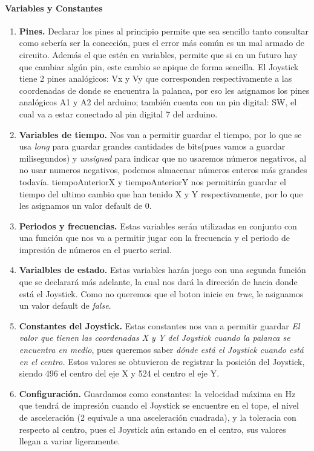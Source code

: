 \documentclass[conference]{IEEEtran}
\begin{document}
  \paragraph{Variables y Constantes}
  \begin{enumerate}
    \item \textbf{Pines.} Declarar los pines al principio permite que sea sencillo tanto consultar como sebería ser la conección, pues el error más común es un mal armado de circuito. Además el que estén en variables, permite que si en un futuro hay que cambiar algún pin, este cambio se apique de forma sencilla. El Joystick tiene 2 pines analógicos: Vx y Vy que corresponden respectivamente a las coordenadas de donde se encuentra la palanca, por eso les asignamos los pines analógicos A1 y A2 del arduino; también cuenta con un pin digital: SW, el cual va a estar conectado al pin digital 7 del arduino.
    \item \textbf{Variables de tiempo.} Nos van a permitir guardar el tiempo, por lo que se usa \textit{long} para guardar grandes cantidades de bits(pues vamos a guardar milisegundos) y \textit{unsigned} para indicar que no usaremos números negativos, al no usar numeros negativos, podemos almacenar números enteros más grandes todavía. tiempoAnteriorX y tiempoAnteriorY nos permitirán guardar el tiempo del ultimo cambio que han tenido X y Y respectivamente, por lo que les asignamos un valor default de 0.
    \item \textbf{Periodos y frecuencias. }Estas variables serán utilizadas en conjunto con una función que nos va a permitir jugar con la frecuencia y el periodo de impresión de números en el puerto serial.
    \item \textbf{Varialbles de estado. } Estas variables harán juego con una segunda función que se declarará más adelante, la cual nos dará la dirección de hacia donde está el Joystick. Como no queremos que el boton inicie en \textit{true}, le asignamos un valor default de \textit{false}.
    \item \textbf{Constantes del Joystick. } Estas constantes nos van a permitir guardar \textit{El valor que tienen las coordenadas X y Y del Joystick cuando la palanca se encuentra en medio}, pues queremos saber \textit{dónde está el Joystick cuando está en el centro.} Estos valores se obtuvieron de registrar la posición del Joystick, siendo 496 el centro del eje X y 524 el centro el eje Y.
    \item \textbf{Configuración.} Guardamos como constantes: la velocidad máxima en Hz que tendrá de impresión cuando el Joystick se encuentre en el tope,  el nivel de asceleración (2 equivale a una asceleración cuadrada), y la toleracia con respecto al centro,  pues el Joystick aún estando en el centro, sus valores llegan a variar ligeramente.
  \end{enumerate}
  
\end{document}
